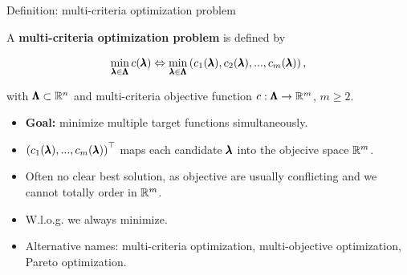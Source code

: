 \begin{frame}{Definition: multi-criteria optimization problem}

A \textbf{multi-criteria optimization problem} is defined by

$$
\min_{\pmb{\lambda} \in \pmb{\Lambda}}  c(\pmb{\lambda}) \Leftrightarrow \min_{\pmb{\lambda} \in \pmb{\Lambda}} \left(c_1(\pmb{\lambda}), c_2(\pmb{\lambda}), ..., c_m(\pmb{\lambda})\right),
$$

with $\pmb{\Lambda} \subset \mathbb{R}^n$ and multi-criteria objective function $c: \pmb{\Lambda} \to \mathbb{R}^m$, $m \ge 2$.

\begin{itemize}
\item \textbf{Goal:} minimize multiple target functions simultaneously.
\item $\left(c_1(\pmb{\lambda}), ..., c_m(\pmb{\lambda})\right)^\top$ maps each candidate $\pmb{\lambda}$ into the objecive space $\mathbb{R}^m$.
\item Often no clear best solution, as objective are usually conflicting and we cannot totally order in $\mathbb{R}^m$. 
\item W.l.o.g. we always minimize.
\item Alternative names: multi-criteria optimization, multi-objective optimization, Pareto optimization.
\end{itemize}

\end{frame}

